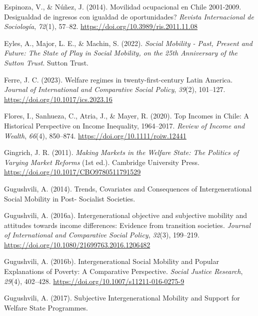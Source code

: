 \documentclass[
  13pt,
]{article}
\newlength{\cslhangindent}
\newenvironment{CSLReferences}[2] %
 {\begin{list}{}{%
  \setlength{\itemindent}{0pt}
  \setlength{\leftmargin}{0pt}
  \setlength{\parsep}{0pt}
  \ifodd #1
   \setlength{\leftmargin}{\cslhangindent}
   \setlength{\itemindent}{-1\cslhangindent}
  \fi
  \setlength{\itemsep}{#2\baselineskip}}}
 {\end{list}}
\begin{document}
\begin{CSLReferences}{1}{0}
Espinoza, V., \& Núñez, J. (2014). Movilidad ocupacional en {Chile}
2001-2009. {\textquestiondown}{Desigualdad} de ingresos con igualdad de
oportunidades? \emph{Revista Internacional de Sociolog{í}a},
\emph{72}(1), 57--82. \url{https://doi.org/10.3989/ris.2011.11.08}

Eyles, A., Major, L. E., \& Machin, S. (2022). \emph{Social {Mobility} -
{Past}, {Present} and {Future}: {The State} of {Play} in {Social
Mobility}, on the 25th {Anniversary} of the {Sutton Trust}}. Sutton
Trust.

Ferre, J. C. (2023). Welfare regimes in twenty-first-century {Latin
America}. \emph{Journal of International and Comparative Social Policy},
\emph{39}(2), 101--127. \url{https://doi.org/10.1017/ics.2023.16}

Flores, I., Sanhueza, C., Atria, J., \& Mayer, R. (2020). Top {Incomes}
in {Chile}: {A Historical Perspective} on {Income Inequality},
1964--2017. \emph{Review of Income and Wealth}, \emph{66}(4), 850--874.
\url{https://doi.org/10.1111/roiw.12441}

Gingrich, J. R. (2011). \emph{Making {Markets} in the {Welfare State}:
{The Politics} of {Varying Market Reforms}} (1st ed.). Cambridge
University Press. \url{https://doi.org/10.1017/CBO9780511791529}

Gugushvili, A. (2014). Trends, {Covariates} and {Consequences} of
{Intergenerational Social Mobility} in {Post- Socialist Societies}.

Gugushvili, A. (2016a). Intergenerational objective and subjective
mobility and attitudes towards income differences: Evidence from
transition societies. \emph{Journal of International and Comparative
Social Policy}, \emph{32}(3), 199--219.
\url{https://doi.org/10.1080/21699763.2016.1206482}

Gugushvili, A. (2016b). Intergenerational {Social Mobility} and {Popular
Explanations} of {Poverty}: {A Comparative Perspective}. \emph{Social
Justice Research}, \emph{29}(4), 402--428.
\url{https://doi.org/10.1007/s11211-016-0275-9}

Gugushvili, A. (2017). Subjective {Intergenerational Mobility} and
{Support} for {Welfare State Programmes}.


\end{CSLReferences}
\end{document}
